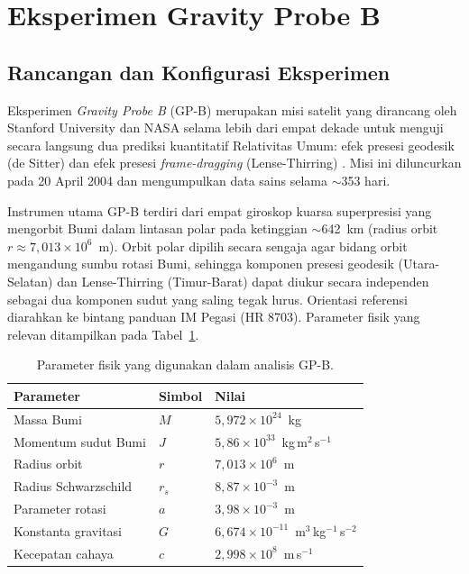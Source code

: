 \section{Eksperimen Gravity Probe B}
\label{sec:gravity-probe-b}

\subsection{Rancangan dan Konfigurasi Eksperimen}
\label{subsec:gpb-rancangan}

Eksperimen \textit{Gravity Probe B} (GP-B) merupakan misi satelit yang dirancang oleh Stanford University dan NASA selama lebih dari empat dekade untuk menguji secara langsung dua prediksi kuantitatif Relativitas Umum: efek presesi geodesik (de Sitter) dan efek presesi \textit{frame-dragging} (Lense-Thirring) \parencite{Turneaure1986GravityProbeBApproach}. Misi ini diluncurkan pada 20 April 2004 dan mengumpulkan data sains selama $\sim$353 hari.

Instrumen utama GP-B terdiri dari empat giroskop kuarsa superpresisi yang mengorbit Bumi dalam lintasan polar pada ketinggian $\sim$642~km (radius orbit $r \approx 7{,}013 \times 10^6$~m). Orbit polar dipilih secara sengaja agar bidang orbit mengandung sumbu rotasi Bumi, sehingga komponen presesi geodesik (Utara-Selatan) dan Lense-Thirring (Timur-Barat) dapat diukur secara independen sebagai dua komponen sudut yang saling tegak lurus. Orientasi referensi diarahkan ke bintang panduan IM Pegasi (HR 8703). Parameter fisik yang relevan ditampilkan pada Tabel~\ref{tab:param-gpb}.

\begin{table}[ht]
\centering
\caption{Parameter fisik yang digunakan dalam analisis GP-B.}
\label{tab:param-gpb}
\begin{tabular}{lll}
\toprule
\textbf{Parameter} & \textbf{Simbol} & \textbf{Nilai} \\
\midrule
Massa Bumi             & $M$    & $5{,}972 \times 10^{24}$~kg \\
Momentum sudut Bumi    & $J$    & $5{,}86 \times 10^{33}$~kg\,m$^2$\,s$^{-1}$ \\
Radius orbit           & $r$    & $7{,}013 \times 10^{6}$~m \\
Radius Schwarzschild   & $r_s$  & $8{,}87 \times 10^{-3}$~m \\
Parameter rotasi       & $a$    & $3{,}98 \times 10^{-3}$~m \\
Konstanta gravitasi    & $G$    & $6{,}674 \times 10^{-11}$~m$^3$\,kg$^{-1}$\,s$^{-2}$ \\
Kecepatan cahaya       & $c$    & $2{,}998 \times 10^{8}$~m\,s$^{-1}$ \\
\bottomrule
\end{tabular}
\end{table}


